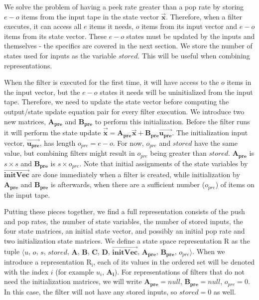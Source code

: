 We solve the problem of having a peek rate greater than a pop
rate by storing $e-o$ items from the input tape in the state
vector $\vec{\mathbf{x}}$. Therefore, when a filter executes, it
can access all $e$ items it needs, $o$ items from its input vector
and $e-o$ items from its state vector. These $e-o$ states must be
updated by the inputs and themselves - the specifics are covered
in the next section. We store the number of states used for inputs
as the variable $stored$. This will be useful when combining
representations.

When the filter is executed for the first time, it will have access to
the $o$ items in the input vector, but the $e-o$ states it needs will
be uninitialized from the input tape. Therefore, we need to update the
state vector before computing the output/state update equation pair
for every filter execution. We introduce two new matrices,
$\mathbf{A_{pre}}$ and $\mathbf{B_{pre}}$ to perform this
initialization. Before the filter runs it will perform the state
update $\vec{\dot{\mathbf{x}}} =
\mathbf{A_{pre}}\vec{\mathbf{x}} +
\mathbf{B_{pre}}\vec{\mathbf{u_{pre}}}$. The initialization input
vector, $\vec{\mathbf{u_{pre}}}$, has length $o_{pre} = e-o$. For
now, $o_{pre}$ and $stored$ have the same value, but combining
filters might result in $o_{pre}$ being greater than $stored$.
$\mathbf{A_{pre}}$ is $s \times s$ and $\mathbf{B_{pre}}$ is $s
\times o_{pre}$. Note that initial assignments of the state
variables by $\overrightarrow{\mathbf{initVec}}$ are done
immediately when a filter is created, while initialization by
$\mathbf{A_{pre}}$ and $\mathbf{B_{pre}}$ is afterwards, when
there are a sufficient number ($o_{pre}$) of items on the input
tape.

Putting these pieces together, we find a full representation consists
of the push and pop rates, the number of state variables, the number
of stored inputs, the four state matrices, an initial state vector,
and possibly an initial pop rate and two initialization state
matrices. We define a state space representation $\mathrm{R}$ as the
tuple $\langle$$u$, $o$, $s$, $stored$, $\mathbf{A}$, $\mathbf{B}$,
$\mathbf{C}$, $\mathbf{D}$, $\overrightarrow{\mathbf{initVec}}$,
$\mathbf{A_{pre}}$, $\mathbf{B_{pre}}$, $o_{pre}$$\rangle$. When we
introduce a representation $\mathrm{R_i}$, each of its values in the
ordered set will be denoted with the index $i$ (for example $u_i$,
$\mathbf{A_i}$). For representations of filters that do not need the
initialization matrices, we will write $\mathbf{A_{pre}} = null$,
$\mathbf{B_{pre}} = null$, $o_{pre} = 0$. In this case, the filter
will not have any stored inputs, so $stored = 0$ as well.

